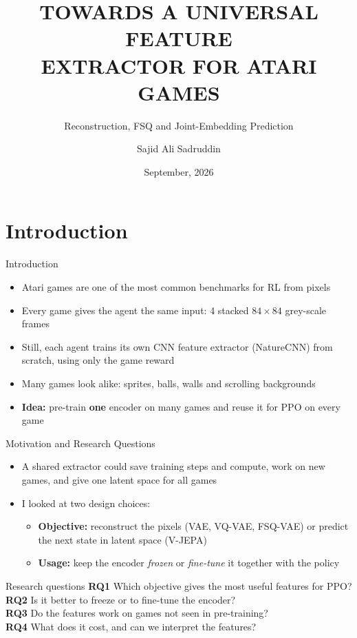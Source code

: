 \documentclass[aspectratio=43,10pt]{beamer}
\title[Universal Feature Extractor for Atari]{TOWARDS A UNIVERSAL FEATURE\\EXTRACTOR FOR ATARI GAMES}
\subtitle{Reconstruction, FSQ and Joint-Embedding Prediction}
\author{Sajid Ali Sadruddin}
\institute[Technische Universit\"at Dresden (TUD)]{Technische Universit\"at Dresden (TUD)}
\date{September, 2026}
\begin{document}
\begin{frame}
  \titlepage
\end{frame}

\begin{frame}
  \vfill
  \tableofcontents
  \vfill
\end{frame}

\section{Introduction}

\begin{frame}{Introduction}
  \begin{itemize}\setlength\itemsep{0.6em}
    \item Atari games are one of the most common benchmarks for RL from pixels
    \item Every game gives the agent the same input: 4 stacked $84\times84$ grey-scale frames
    \item Still, each agent trains its own CNN feature extractor (NatureCNN) from scratch,
          using only the game reward
    \item Many games look alike: sprites, balls, walls and scrolling backgrounds
    \item \textbf{Idea:} pre-train \textbf{one} encoder on many games and reuse it for PPO
          on every game
  \end{itemize}
\end{frame}

\begin{frame}{Motivation and Research Questions}
  \begin{itemize}\setlength\itemsep{0.4em}
    \item A shared extractor could save training steps and compute, work on new games, and
          give one latent space for all games
    \item I looked at two design choices:
      \begin{itemize}
        \item \textbf{Objective:} reconstruct the pixels (VAE, VQ-VAE, FSQ-VAE) or predict the
              next state in latent space (V-JEPA)
        \item \textbf{Usage:} keep the encoder \emph{frozen} or \emph{fine-tune} it together
              with the policy
      \end{itemize}
  \end{itemize}
  \vspace{0.3em}
  \begin{block}{Research questions}
    \small
    \textbf{RQ1} Which objective gives the most useful features for PPO?\\
    \textbf{RQ2} Is it better to freeze or to fine-tune the encoder?\\
    \textbf{RQ3} Do the features work on games not seen in pre-training?\\
    \textbf{RQ4} What does it cost, and can we interpret the features?
  \end{block}
\end{frame}
\end{document}
